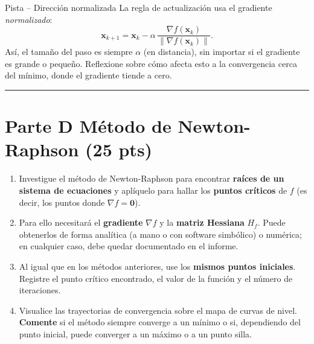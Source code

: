 \documentclass[12pt,a4paper]{article}
\begin{document}
\begin{ayuda}{Pista -- Dirección normalizada}
\vspace{2pt}
La regla de actualización usa el gradiente \emph{normalizado}:
\[
    \mathbf{x}_{k+1} = \mathbf{x}_k
    - \alpha \,\frac{\nabla f(\mathbf{x}_k)}{\lVert \nabla f(\mathbf{x}_k)\rVert}.
\]
Así, el tamaño del paso es siempre $\alpha$ (en distancia), sin importar si el
gradiente es grande o pequeño. Reflexione sobre cómo afecta esto a la
convergencia cerca del mínimo, donde el gradiente tiende a cero.
\end{ayuda}

\noindent\rule{\linewidth}{0.4pt}

\section*{Parte D \quad Método de Newton-Raphson \hfill\normalfont\normalsize(25 pts)}

\begin{enumerate}[label=\alph*), leftmargin=*, topsep=2pt]
    \item Investigue el método de Newton-Raphson para encontrar
          \textbf{raíces de un sistema de ecuaciones} y aplíquelo para hallar
          los \textbf{puntos críticos} de $f$ (es decir, los puntos donde
          $\nabla f = \mathbf{0}$).
    \item Para ello necesitará el \textbf{gradiente} $\nabla f$ y la
          \textbf{matriz Hessiana} $H_f$. Puede obtenerlos de forma analítica
          (a mano o con software simbólico) o numérica; en cualquier caso,
          debe quedar documentado en el informe.
    \item Al igual que en los métodos anteriores, use los \textbf{mismos
          puntos iniciales}. Registre el punto crítico encontrado, el valor de
          la función y el número de iteraciones.
    \item Visualice las trayectorias de convergencia sobre el mapa de curvas
          de nivel. \textbf{Comente} si el método siempre converge a un mínimo
          o si, dependiendo del punto inicial, puede converger a un máximo o a
          un punto silla.
\end{enumerate}
\end{document}
